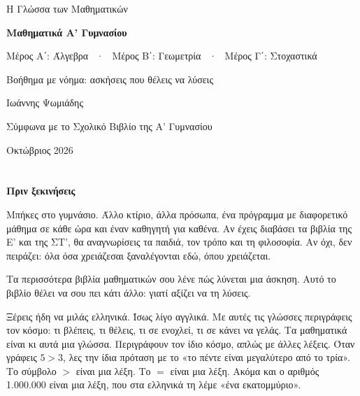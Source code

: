 \thispagestyle{empty}
\begin{center}
\vspace*{26mm}
{\color{ggray}\small Η Γλώσσα των Μαθηματικών}\par\vspace{16mm}
{\bfseries\fontsize{24}{30}\selectfont Μαθηματικά Α’ Γυμνασίου\par}\vspace{9mm}
{\small Μέρος Α΄: Άλγεβρα \ · \ Μέρος Β΄: Γεωμετρία \ · \ Μέρος Γ΄: Στοχαστικά\par}\vspace{9mm}
{\color{gblue}\large Βοήθημα με νόημα: ασκήσεις που θέλεις να λύσεις\par}\vspace{40mm}
Ιωάννης Ψωμιάδης\par\vspace{2mm}
{\color{ggray}\scriptsize Σύμφωνα με το Σχολικό Βιβλίο της Α’ Γυμνασίου\par}\vspace{6mm}
{\small Οκτώβριος 2026\par}
\end{center}
\cleardoublepage
\pagestyle{fancy}

\chapter*{}\vspace{-22mm}
{\color{gblue}\bfseries\Large Πριν ξεκινήσεις}\par\vspace{4mm}

Μπήκες στο γυμνάσιο. Άλλο κτίριο, άλλα πρόσωπα, ένα πρόγραμμα με διαφορετικό μάθημα σε κάθε ώρα και έναν καθηγητή για καθένα. Αν έχεις διαβάσει τα βιβλία της Ε’ και της ΣΤ’, θα αναγνωρίσεις τα παιδιά, τον τρόπο και τη φιλοσοφία. Αν όχι, δεν πειράζει: όλα όσα χρειάζεσαι ξαναλέγονται εδώ, όπου χρειάζεται.

Τα περισσότερα βιβλία μαθηματικών σου λένε πώς λύνεται μια άσκηση. Αυτό το βιβλίο θέλει να σου πει κάτι άλλο: γιατί αξίζει να τη λύσεις.

Ξέρεις ήδη να μιλάς ελληνικά. Ίσως λίγο αγγλικά. Με αυτές τις γλώσσες περιγράφεις τον κόσμο: τι βλέπεις, τι θέλεις, τι σε ενοχλεί, τι σε κάνει να γελάς. Τα μαθηματικά είναι κι αυτά μια γλώσσα. Περιγράφουν τον ίδιο κόσμο, απλώς με άλλες λέξεις. Όταν γράφεις $5>3$, λες την ίδια πρόταση με το «το πέντε είναι μεγαλύτερο από το τρία». Το σύμβολο $>$ είναι μια λέξη. Το $=$ είναι μια λέξη. Ακόμα και ο αριθμός 1.000.000 είναι μια λέξη, που στα ελληνικά τη λέμε «ένα εκατομμύριο».

